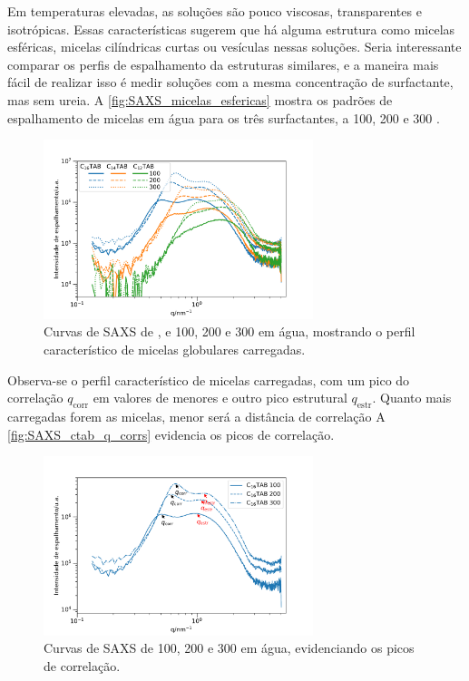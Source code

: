 	Em temperaturas elevadas, as soluções são pouco viscosas, transparentes e isotrópicas. Essas características sugerem que há alguma estrutura como micelas esféricas, micelas cilíndricas curtas ou vesículas nessas soluções. Seria interessante comparar os perfis de espalhamento da estruturas similares, e a maneira mais fácil de realizar isso é medir soluções com a mesma concentração de surfactante, mas sem ureia. A \autoref{fig:SAXS_micelas_esfericas} mostra os padrões de espalhamento de micelas em água para os três surfactantes, a 100, 200 e 300 \mM.
	
	\begin{figure}[h]
		\centering
		\includegraphics[width=0.7\textwidth]{imagens/saxs/micelas_esfericas}
		\caption{Curvas de SAXS de \CTAB, \TTAB{} e \DTAB{} 100, 200 e 300 \mM{} em água, mostrando o perfil característico de micelas globulares carregadas.}
		\label{fig:SAXS_micelas_esfericas}
	\end{figure}
	
	Observa-se o perfil característico de micelas carregadas, com um pico do correlação \(q_\mathrm{corr}\) em valores de \q{} menores e outro pico estrutural \(q_\mathrm{estr}\).\cite{Lutz-Bueno2017} Quanto mais carregadas forem as micelas, menor será a distância de correlação  A \autoref{fig:SAXS_ctab_q_corrs} evidencia os picos de correlação. 
	
	\begin{figure}[h]
		\centering
		\includegraphics[width=0.7\textwidth]{imagens/saxs/CTAB_q_corrs}
		\caption{Curvas de SAXS de \CTAB{} 100, 200 e 300 \mM{} em água, evidenciando os picos de correlação.}
		\label{fig:SAXS_ctab_q_corrs}
	\end{figure}

